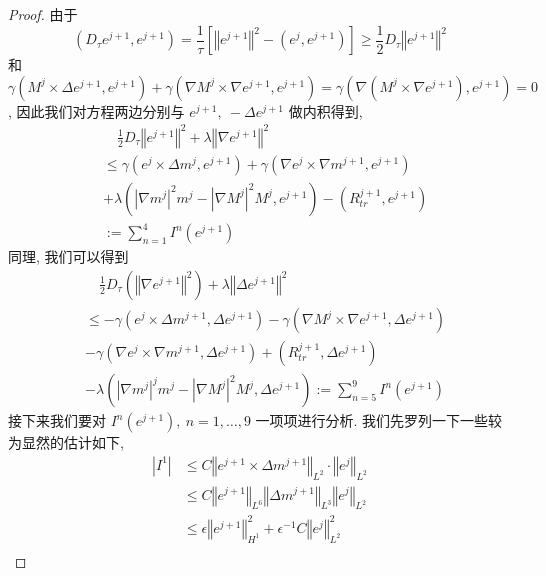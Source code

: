 \documentclass[UTF8,a4paper]{article}
\begin{document}
\begin{proof}
由于
\begin{equation*}
(D_{\tau}e^{j+1},e^{j+1})=\frac{1}{\tau}\left[ \left\Vert e^{j+1}\right\Vert ^2-(e^j,e^{j+1})\right]\geq \frac{1}{2}D_{\tau}\left\Vert e^{j+1}\right\Vert^2
\end{equation*}
和
\begin{equation*}
\gamma(M^j\times\Delta e^{j+1},e^{j+1})+\gamma(\nabla M^j\times\nabla e^{j+1},e^{j+1})=\gamma(\nabla(M^j\times\nabla e^{j+1}),e^{j+1})=0
\end{equation*}
, 因此我们对方程两边分别与 $e^{j+1},\ -\Delta e^{j+1}$ 做内积得到,
\begin{align*}
  & \quad \frac{1}{2}D_{\tau}\left\Vert e^{j+1}\right\Vert^2+\lambda \left\Vert \nabla e^{j+1}\right\Vert^2\\
  &\leq \gamma(e^j\times\Delta m^j,e^{j+1})+\gamma(\nabla e^j\times\nabla m^{j+1},e^{j+1})\\
                                                                     &+\lambda(\left| \nabla m^j \right|^2m^j-\left| \nabla M^j\right| ^2M^j,e^{j+1})-(R_{tr}^{j+1},e^{j+1})\\
 &:=\sum_{n=1}^4I^n(e^{j+1})
\end{align*}
同理, 我们可以得到
\begin{align*}
  &\quad \frac{1}{2}D_{\tau}\!\left( \left\Vert \nabla e^{j+1}\right\Vert^2 \right)+\lambda \left\Vert \Delta e^{j+1}\right\Vert^2\\
  &\leq-\gamma(e^j\!\times\!\Delta m^{j+1},\Delta e^{j+1})-\gamma(\nabla M^j\!\times\!\nabla e^{j+1},\Delta e^{j+1})\\
                                                                                        &-\gamma(\nabla e^j\times\nabla m^{j+1},\Delta e^{j+1})+(R_{tr}^{j+1},\Delta e^{j+1})\\
  &-\lambda(\left| \nabla m^j\right| ^jm^j-\left| \nabla M^j \right|^2M^j,\Delta e^{j+1}):=\sum_{n=5}^9I^n(e^{j+1})
\end{align*}
接下来我们要对 $I^n(e^{j+1}),\ n=1,\dots,9$ 一项项进行分析. 我们先罗列一下一些较为显然的估计如下,
\begin{align*}
  \left| I^1 \right|&\leq C \left\Vert e^{j+1}\times\Delta m^{j+1}\right\Vert_{L^2}\cdot \left\Vert e^j\right\Vert_{L^2}\\
                    &\leq C \left\Vert e^{j+1}\right\Vert_{L^6} \left\Vert \Delta m^{j+1}\right\Vert_{L^3}\left\Vert e^j\right\Vert_{L^2}\\
                    &\leq \epsilon \left\Vert e^{j+1}\right\Vert_{H^1}^2+\epsilon^{-1}C \left\Vert e^j\right\Vert_{L^2}^{2}\\

\end{align*}
\end{proof}
\end{document}
